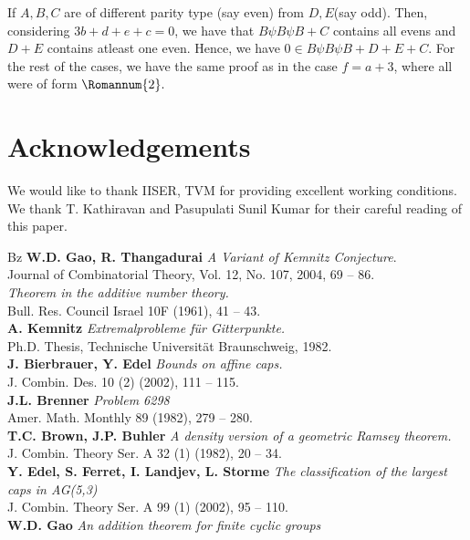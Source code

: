 \documentclass[reqno,10pt]{amsart}
\newtheorem{remar}[prop]{Remark}
\newcommand{\two}{\Romannum {2}}
\begin{document}
{If $A,B,C$ are of different parity type (say even) from $D,E$(say odd). Then, considering $3b+d+e+c=0$, we have that $B \psi B \psi B+ C$ contains all evens and $D+E$ contains atleast one even. Hence, we have $ 0 \in B \psi B \psi B+ D+E+C.$
For the rest of the cases, we have the same proof as in the case $f=a+3$, where all were of form $\two.$
\section*{Acknowledgements}
We would like to thank IISER, TVM for providing excellent working conditions. 
We thank T. Kathiravan and Pasupulati Sunil Kumar for their careful reading of this paper.
\begin{thebibliography}{Bz}
 {\bf W.D. Gao, R. Thangadurai}
{\it A Variant of Kemnitz Conjecture}.
\\
Journal of Combinatorial Theory, Vol. 12, No. 107, 2004, 69 -- 86.
\\
{\it Theorem in the additive number theory.}
\\
Bull. Res. Council Israel 10F (1961), 41 -- 43.
\\
 {\bf A. Kemnitz} 
{\it Extremalprobleme f\"{u}r Gitterpunkte.}\\ Ph.D. Thesis, Technische Universit\"{a}t Braunschweig, 1982.
\\
 {\bf J. Bierbrauer, Y. Edel}
{\it  Bounds on affine caps.}\\
J. Combin. Des. 10 (2) (2002), 111 -- 115.
\\
 {\bf J.L. Brenner}
{\it Problem 6298}\\
 Amer. Math. Monthly 89 (1982), 279 -- 280.
\\
 {\bf T.C. Brown, J.P. Buhler}
{\it A density version of a geometric Ramsey theorem.} 
\\
J. Combin. Theory Ser. A 32 (1) (1982), 20 -- 34.
\\
 {\bf Y. Edel, S. Ferret, I. Landjev, L. Storme}
{\it The classification of the largest caps in AG(5,3)}
\\
J. Combin. Theory Ser. A 99 (1) (2002), 95 -- 110. 
\\
 {\bf W.D. Gao}
{\it An addition theorem for finite cyclic groups}

\end{thebibliography}}
\end{document}
